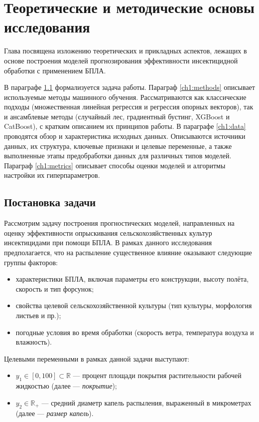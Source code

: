 \chapter{Теоретические и методические основы исследования} \label{ch1}

Глава посвящена изложению теоретических и прикладных аспектов, лежащих в основе построения моделей прогнозирования эффективности инсектицидной обработки с применением БПЛА.

В параграфе \ref{ch1:task} формализуется задача работы. Параграф \ref{ch1:methods} описывает используемые методы машинного обучения. Рассматриваются как классические подходы (множественная линейная регрессия и регрессия опорных векторов), так и ансамблевые методы (случайный лес, градиентный бустинг, XGBoost и CatBoost), с кратким описанием их принципов работы. В параграфе \ref{ch1:data} проводятся обзор и характеристика исходных данных. Описываются источники данных, их структура, ключевые признаки и целевые переменные, а также выполненные этапы предобработки данных для различных типов моделей. Параграф \ref{ch1:metrics} описывает способы оценки моделей и алгоритмы настройки их гиперпараметров.

\section{Постановка задачи} \label{ch1:task}
Рассмотрим задачу построения прогностических моделей, направленных на оценку эффективности опрыскивания сельскохозяйственных культур инсектицидами при помощи БПЛА. В рамках данного исследования предполагается, что на распыление существенное влияние оказывают следующие группы факторов: 
\begin{itemize}
\item характеристики БПЛА, включая параметры его конструкции, высоту полёта, скорость и тип форсунок; 
\item свойства целевой сельскохозяйственной культуры (тип культуры, морфология листьев и пр.); 
\item погодные условия во время обработки (скорость ветра, температура воздуха и влажность).
\end{itemize}

Целевыми переменными в рамках данной задачи выступают:
\begin{itemize}
\item $y_1 \in [0, 100] \subset \mathbb{R}$ --- процент площади покрытия растительности рабочей жидкостью (далее --- \textit{покрытие});
\item $y_2 \in \mathbb{R}_{+}$ --- средний диаметр капель распыления, выраженный в микрометрах (далее --- \textit{размер капель}).
\end{itemize}

